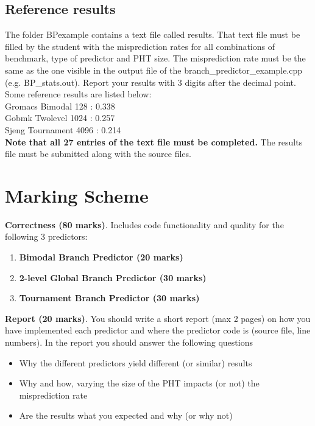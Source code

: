 \documentclass[a4paper,12pt]{article}
\newcommand\mycomment[3]{\PackageWarning{null}{There are still outstanding comments/issues from #2}\noindent{#1 {\bf \fbox{#2}} {\it#3}}}
\newcommand{\hlc}[2][yellow]{ {\sethlcolor{#1} \hl{#2}} }
\newcommand{\fix}[1]{\hlc[lightred]{#1}}
\newcommand\vijay[1]{\mycomment{\color{magenta}}{vijay}{#1}}
\theoremstyle{plain}
\begin{document}
\subsection{Reference results}
The folder BPexample contains a text file called results. That text file must be filled by the student with the misprediction rates for all combinations of benchmark, type of predictor and PHT size. The misprediction rate must be the same as the one visible in the output file of the branch\_predictor\_example.cpp (e.g. BP\_stats.out). Report your results with 3 digits after the decimal point. Some reference results are listed below: \\

\noindent Gromacs Bimodal 128 : 0.338\\
Gobmk Twolevel 1024 : 0.257\\
Sjeng Tournament 4096 : 0.214\\

\textbf{Note that all 27 entries of the text file must be completed.} The results file must be submitted along with the source files.




\section{Marking Scheme}

\noindent
\textbf{ Correctness (80 marks)}. Includes code functionality and  quality for the following 3 predictors:%

\begin{enumerate}

\item \textbf{Bimodal Branch Predictor (20 marks)}
\item \textbf{2-level Global Branch Predictor (30 marks)}
\item \textbf{Tournament Branch Predictor (30 marks)}

\end{enumerate}
\noindent
\textbf{Report (20 marks)}. You should write a short report (max 2 pages) on how you have
implemented each predictor and where the predictor code is (source file, line numbers).  In the report you should answer the following questions 
\begin{itemize}
\item Why the different predictors yield different (or similar) results
\item Why and how,  varying the size of the PHT impacts (or not) the misprediction rate
\item Are the results what you expected and why (or why not)
\end{itemize}
\end{document}
